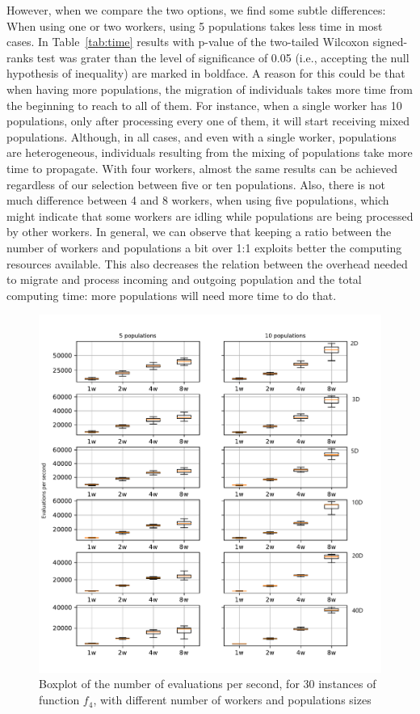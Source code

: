 \documentclass[review]{elsarticle}
\begin{document}
However, when we compare the two options, we find some subtle differences: When
using one or two workers, using 5 populations takes less time in most cases. In
Table~\ref{tab:time} results with p-value of the two-tailed Wilcoxon
signed-ranks test was grater than the level of significance of 0.05 (i.e.,
accepting the null hypothesis of inequality) are marked in boldface. A reason
for this could be that when having more populations, the migration of
individuals takes more time from the beginning to reach to all of them. For
instance, when a single worker has 10 populations, only after processing every
one of them, it will start receiving mixed populations. Although, in all cases,
and even with a single worker, populations are heterogeneous, individuals
resulting from the mixing of populations take more time to propagate. With four
workers, almost the same results can be achieved regardless of our selection
between five or ten populations. Also, there is not much difference between 4
and 8 workers, when using five populations, which might indicate that some
workers are idling while populations are being processed by other workers. In
general, we can observe that keeping a ratio between the number of workers and
populations a bit over 1:1 exploits better the computing resources available.
This also decreases the relation between the overhead needed to migrate and
process incoming and outgoing population and the total computing time: more
populations will need more time to do that.

%
%
\begin{figure}[h!tbp]
  \centering
  \includegraphics[width=\textwidth]{evalspersecond}
  \caption{Boxplot of the number of evaluations per second, for 30 instances of function $f_4$, with different number of workers and populations sizes }
  \label{fig:spworker:evalspersecond}
\end{figure}
%
\end{document}
